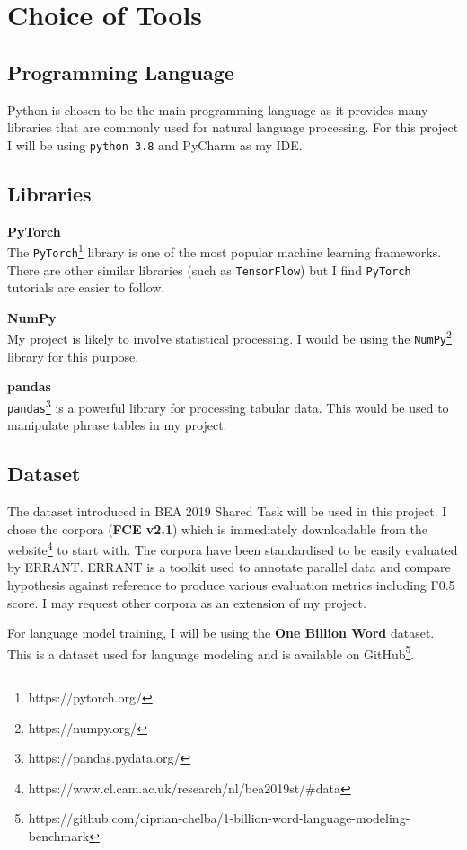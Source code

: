 \documentclass[12pt,a4paper,twoside,openright]{report}
\begin{document}
\section{Choice of Tools}

\subsection{Programming Language}

Python is chosen to be the main programming language as it provides many libraries that are commonly used for natural language processing. For this project I will be using \texttt{python 3.8} and PyCharm as my IDE.

\subsection{Libraries}
\textbf{PyTorch} \\
The \texttt{PyTorch}\footnote{https://pytorch.org/} library is one of the most popular machine learning frameworks. There are other similar libraries (such as \texttt{TensorFlow}) but I find \texttt{PyTorch} tutorials are easier to follow.

\textbf{NumPy} \\
My project is likely to involve statistical processing. I would be using the \texttt{NumPy}\footnote{https://numpy.org/} library for this purpose.

\textbf{pandas} \\
\texttt{pandas}\footnote{https://pandas.pydata.org/} is a powerful library for processing tabular data. This would be used to manipulate phrase tables in my project.

\subsection{Dataset}
The dataset introduced in BEA 2019 Shared Task\cite{bryant-etal-2019-bea} will be used in this project. I chose the corpora (\textbf{FCE v2.1}) which is immediately downloadable from the website\footnote{https://www.cl.cam.ac.uk/research/nl/bea2019st/\#data} to start with. The corpora have been standardised to be easily evaluated by ERRANT\cite{bryant-etal-2017-automatic,felice-etal-2016-automatic}. ERRANT is a toolkit used to annotate parallel data and compare hypothesis against reference to produce various evaluation metrics including F0.5 score. I may request other corpora as an extension of my project.

For language model training, I will be using the \textbf{One Billion Word} dataset\cite{one-billion-word}. This is a dataset used for language modeling and is available on GitHub\footnote{https://github.com/ciprian-chelba/1-billion-word-language-modeling-benchmark}.
\end{document}
